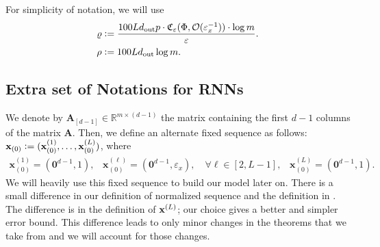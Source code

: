



For simplicity of notation, we will use
\begin{align*}
    &\varrho :=\frac{100 L d_{\mathrm{out}}  p \cdot \mathfrak{C}_{\varepsilon}(\Phi, \mathcal{O}(\varepsilon_x^{-1})) \cdot \log m}{\varepsilon}. \\&
    \rho :=100 L d_{\mathrm{out}}  \log m.
\end{align*}


\subsection{Extra set of Notations for RNNs}
We denote by $\mathbf{A}_{[d-1]}  \in \mathbb{R}^{m \times (d-1)}$ the matrix containing the first $d-1$ columns of the matrix $\mathbf{A}$. Then, we define an alternate fixed sequence as follows: $\mathbf{x}_{(0)} := (\mathbf{x}^{(1)}_{(0)}, \ldots, \mathbf{x}^{(L)}_{(0)})$, where
	\begin{align*}
		\mathbf{x}^{(1)}_{(0)} = (\mathbf{0}^{d-1}, 1), \;\;\;
		\mathbf{x}^{(\ell)}_{(0)} = (\mathbf{0}^{d-1}, \varepsilon_x), \quad \forall \ell \in [2, L-1], \;\;\;
		\mathbf{x}^{(L)}_{(0)} = (\mathbf{0}^{d-1}, 1).
	\end{align*}
	We will heavily use this fixed sequence to build our model later on.  There is a small difference in our definition of normalized sequence and the definition in \cite{allen2019can}. The difference is in the definition of $\mathbf{x}^{(L)}$; our choice gives a better and simpler error bound. This difference leads to only minor changes in the theorems that we take from \cite{allen2019can} and we will account for those changes.

